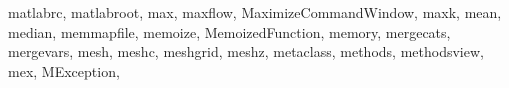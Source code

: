 {{%
        matlabrc,%
        matlabroot,%
        max,%
        maxflow,%
        MaximizeCommandWindow,%
        maxk,%
        mean,%
        median,%
        memmapfile,%
        memoize,%
        MemoizedFunction,%
        memory,%
        mergecats,%
        mergevars,%
        mesh,%
        meshc,%
        meshgrid,%
        meshz,%
        metaclass,%
        methods,%
        methodsview,%
        mex,%
        MException,%
}}
